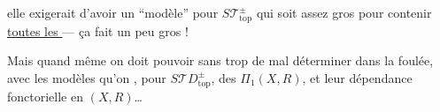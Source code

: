 elle exigerait d'avoir un ``modèle'' pour $S\mathcal T_{\mathrm{top}}^\pm$ qui soit assez gros pour contenir  \uline{toutes les } --- ça fait un peu gros !

Mais quand même on doit pouvoir sans trop de mal déterminer dans la foulée, avec les modèles qu'on , pour $S\mathcal TD_{\mathrm{top}}^\pm$, des  $\Pi_1(X,R)$, et leur dépendance fonctorielle en $(X,R)$\ldots
{}
